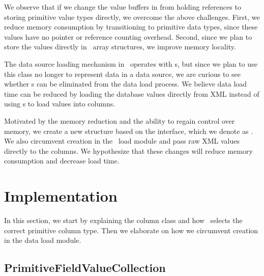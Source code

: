 We observe that if we change the value buffers in  from holding  references to storing primitive value types directly, we overcome the above challenges. First, we reduce memory consumption by transitioning to primitive data types, since these values have no pointer or reference counting overhead. Second, since we plan to store the values directly in \delphi~array structures, we improve memory locality.

The data source loading mechanism in \gap~operates with s, but since we plan to use this class no longer to represent data in a data source, we are curious to see whether s can be eliminated from the data load process. We believe data load time can be reduced by loading the database values directly from XML instead of using s to load values into columns.

Motivated by the memory reduction and the ability to regain control over memory, we create a new structure based on the  interface, which we denote as . We also circumvent  creation in the \gap~load module and pass raw XML values directly to the columns. We hypothesize that these changes will reduce memory consumption and decrease load time.

\section{Implementation}
\label{sec:Implementation}
In this section, we start by explaining the  column class and how \gap~selects the correct primitive column type. Then we elaborate on how we circumvent  creation in the data load module.

\subsection{PrimitiveFieldValueCollection}
\label{sub:PrimitiveFieldValueCollection}


